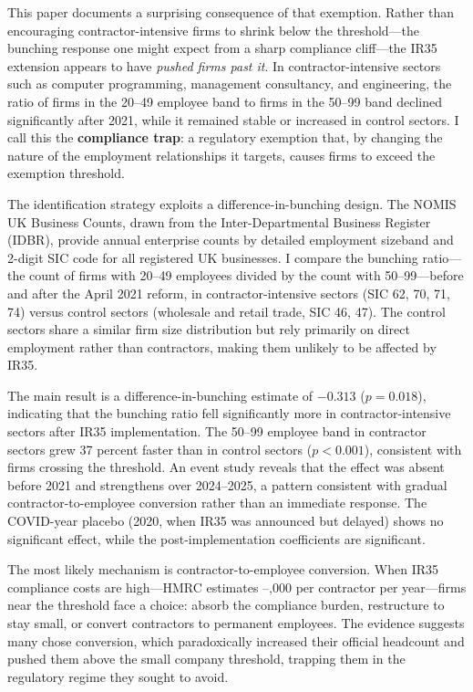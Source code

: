 \documentclass[12pt]{article}
\begin{document}
This paper documents a surprising consequence of that exemption. Rather than encouraging contractor-intensive firms to shrink below the threshold---the bunching response one might expect from a sharp compliance cliff---the IR35 extension appears to have \textit{pushed firms past it}. In contractor-intensive sectors such as computer programming, management consultancy, and engineering, the ratio of firms in the 20--49 employee band to firms in the 50--99 band declined significantly after 2021, while it remained stable or increased in control sectors. I call this the \textbf{compliance trap}: a regulatory exemption that, by changing the nature of the employment relationships it targets, causes firms to exceed the exemption threshold.

The identification strategy exploits a difference-in-bunching design. The NOMIS UK Business Counts, drawn from the Inter-Departmental Business Register (IDBR), provide annual enterprise counts by detailed employment sizeband and 2-digit SIC code for all registered UK businesses. I compare the bunching ratio---the count of firms with 20--49 employees divided by the count with 50--99---before and after the April 2021 reform, in contractor-intensive sectors (SIC 62, 70, 71, 74) versus control sectors (wholesale and retail trade, SIC 46, 47). The control sectors share a similar firm size distribution but rely primarily on direct employment rather than contractors, making them unlikely to be affected by IR35.

The main result is a difference-in-bunching estimate of $-0.313$ ($p = 0.018$), indicating that the bunching ratio fell significantly more in contractor-intensive sectors after IR35 implementation. The 50--99 employee band in contractor sectors grew 37 percent faster than in control sectors ($p < 0.001$), consistent with firms crossing the threshold. An event study reveals that the effect was absent before 2021 and strengthens over 2024--2025, a pattern consistent with gradual contractor-to-employee conversion rather than an immediate response. The COVID-year placebo (2020, when IR35 was announced but delayed) shows no significant effect, while the post-implementation coefficients are significant.

The most likely mechanism is contractor-to-employee conversion. When IR35 compliance costs are high---HMRC estimates --,000 per contractor per year---firms near the threshold face a choice: absorb the compliance burden, restructure to stay small, or convert contractors to permanent employees. The evidence suggests many chose conversion, which paradoxically increased their official headcount and pushed them above the small company threshold, trapping them in the regulatory regime they sought to avoid.
\end{document}
